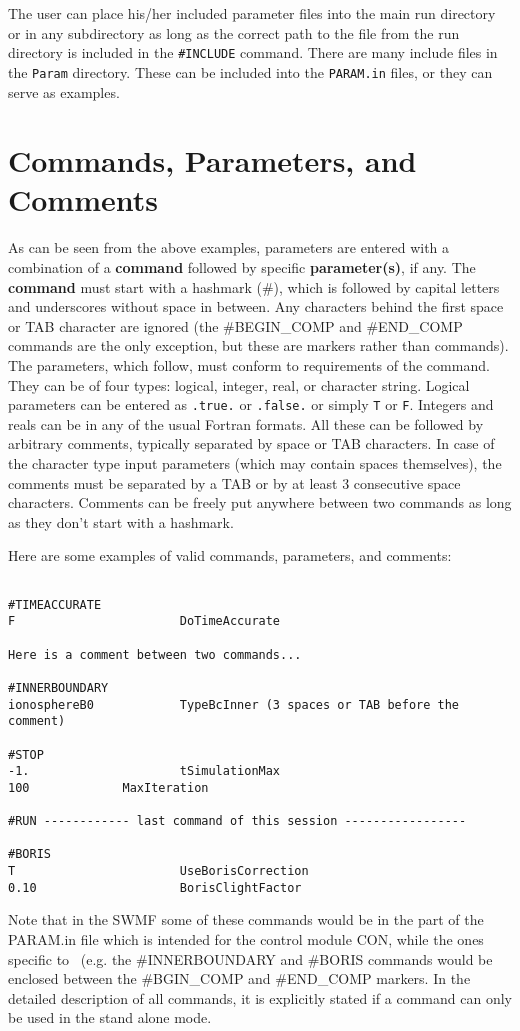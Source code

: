 The user can place his/her
included parameter files into the main run directory or in any subdirectory
as long as the correct path to the file from the run directory is
included in the {\tt \#INCLUDE} command.
There are many include files in the {\tt Param} directory. These
can be included into the {\tt PARAM.in} files, or they can serve as
examples. 

\section{Commands, Parameters, and Comments \label{section:commands}}

As can be seen from the above examples,  parameters are entered
with a combination of a {\bf command} followed by specific {\bf parameter(s)},
if any.
The {\bf command} must start with a hashmark (\#), which 
is followed by capital letters and underscores without space in between. 
Any characters behind the first space or TAB character are ignored
(the \#BEGIN\_COMP and \#END\_COMP commands are the only exception,
but these are markers rather than commands).
The parameters, which follow, must conform to 
requirements of the command. They can be of four types: logical, integer,
real, or character string. Logical parameters can be entered as 
{\tt .true.} or {\tt .false.} or simply {\tt T} or {\tt F}.
Integers and reals can be in any of the usual Fortran formats.
All these can be followed by arbitrary comments, typically separated
by space or TAB characters. In case of the character type input
parameters (which may contain spaces themselves), the comments must
be separated by a TAB or by at least 3 consecutive space characters.
Comments can be freely put anywhere between two commands as long
as they don't start with a hashmark.

Here are some examples of valid commands, parameters, and comments:
\begin{verbatim}

#TIMEACCURATE
F                       DoTimeAccurate

Here is a comment between two commands...

#INNERBOUNDARY
ionosphereB0            TypeBcInner (3 spaces or TAB before the comment)

#STOP
-1.                     tSimulationMax
100		        MaxIteration

#RUN ------------ last command of this session -----------------

#BORIS
T                       UseBorisCorrection
0.10                    BorisClightFactor

\end{verbatim}
Note that in the SWMF some of these commands would be in the
part of the PARAM.in file which is intended for the control 
module CON, while the ones specific to \BATSRUS\ (e.g. the
\#INNERBOUNDARY and \#BORIS commands would be enclosed
between the \#BGIN\_COMP and \#END\_COMP markers.
In the detailed description of all commands, 
it is explicitly stated if a command can only be used in 
the stand alone mode.

